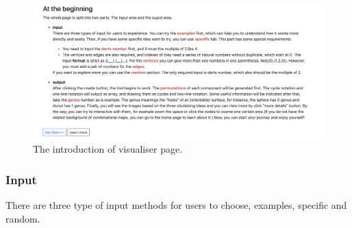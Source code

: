   \begin{figure}[htb]
    \centering
    \includegraphics[width=1\textwidth]{../../image/head2.png}
    \caption{The introduction of visualiser page.}
    \label{fig:figures:head2}
  \end{figure}

  \subsubsection{Input}
  There are three type of input methods for users to choose, examples, specific and random.

